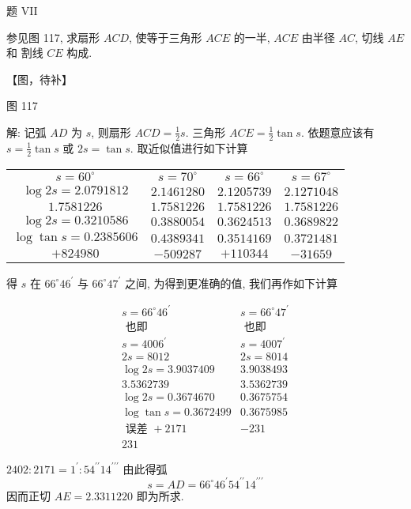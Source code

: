 题 VII

参见图 117, 求扇形 $A C D$, 使等于三角形 $A C E$ 的一半, $A C E$ 由半径 $A C$, 切线 $A E$ 和 割线 $C E$ 构成.


【图，待补】

图 117

解: 记弧 $A D$ 为 $s$, 则扇形 $A C D=\frac{1}{2} s$. 三角形 $A C E=\frac{1}{2} \tan s$. 依题意应该有 $s=\frac{1}{2} \tan s$ 或 $2 s=\tan s$. 取近似值进行如下计算

\begin{tabular}{cccc}
$s=60^{\circ}$ & $s=70^{\circ}$ & $s=66^{\circ}$ & $s=67^{\circ}$ \\
$\log 2 s=2.0791812$ & $2.1461280$ & $2.1205739$ & $2.1271048$ \\
$1.7581226$ & $1.7581226$ & $1.7581226$ & $1.7581226$ \\
\hline $\log 2 s=0.3210586$ & $0.3880054$ & $0.3624513$ & $0.3689822$ \\
\hline $\log \tan s=0.2385606$ & $0.4389341$ & $0.3514169$ & $0.3721481$ \\
\hline$+824980$ & $-509287$ & $+110344$ & $-31659$
\end{tabular}

得 $s$ 在 $66^{\circ} 46^{\prime}$ 与 $66^{\circ} 47^{\prime}$ 之间, 为得到更准确的值, 我们再作如下计算


\[
\begin{array}{c|c}
 s=66^{\circ} 46^{\prime} & s=66^{\circ} 47^{\prime} \\
 \text { 也即 } & \text { 也即 } \\
 s=4006^{\prime} & s=4007^{\prime} \\
 2 s=8012 & 2 s=8014 \\
 \log 2 s=3.9037409 & 3.9038493 \\

3.5362739 & 3.5362739 \\
\hline \log 2 s=0.3674670 & 0.3675754 \\
 \log \tan s=0.3672499 & 0.3675985 \\
\hline
 \text { 误差 }+2171& - 231 \\
\hline
 231 
\end{array}
\]

$2402: 2171=1^{\prime}: 54^{\prime \prime} 14^{\prime \prime \prime}$ 由此得弧
\[
s=A D=66^{\circ} 46^{\prime} 54^{\prime \prime} 14^{\prime \prime \prime}
\]
因而正切 $A E=2.3311220$ 即为所求.

